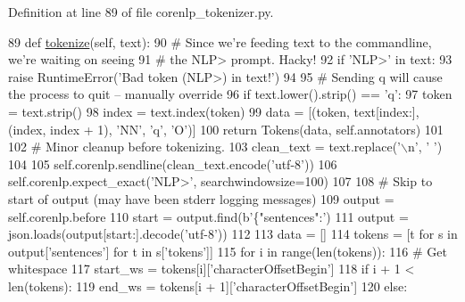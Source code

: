 Definition at line 89 of file corenlp\+\_\+tokenizer.\+py.


\begin{DoxyCode}
89     \textcolor{keyword}{def }\hyperlink{namespaceparlai_1_1agents_1_1tfidf__retriever_1_1build__tfidf_a1fdb457e98eb4e4c26047e229686a616}{tokenize}(self, text):
90         \textcolor{comment}{# Since we're feeding text to the commandline, we're waiting on seeing}
91         \textcolor{comment}{# the NLP> prompt. Hacky!}
92         \textcolor{keywordflow}{if} \textcolor{stringliteral}{'NLP>'} \textcolor{keywordflow}{in} text:
93             \textcolor{keywordflow}{raise} RuntimeError(\textcolor{stringliteral}{'Bad token (NLP>) in text!'})
94 
95         \textcolor{comment}{# Sending q will cause the process to quit -- manually override}
96         \textcolor{keywordflow}{if} text.lower().strip() == \textcolor{stringliteral}{'q'}:
97             token = text.strip()
98             index = text.index(token)
99             data = [(token, text[index:], (index, index + 1), \textcolor{stringliteral}{'NN'}, \textcolor{stringliteral}{'q'}, \textcolor{stringliteral}{'O'})]
100             \textcolor{keywordflow}{return} Tokens(data, self.annotators)
101 
102         \textcolor{comment}{# Minor cleanup before tokenizing.}
103         clean\_text = text.replace(\textcolor{stringliteral}{'\(\backslash\)n'}, \textcolor{stringliteral}{' '})
104 
105         self.corenlp.sendline(clean\_text.encode(\textcolor{stringliteral}{'utf-8'}))
106         self.corenlp.expect\_exact(\textcolor{stringliteral}{'NLP>'}, searchwindowsize=100)
107 
108         \textcolor{comment}{# Skip to start of output (may have been stderr logging messages)}
109         output = self.corenlp.before
110         start = output.find(b\textcolor{stringliteral}{'\{"sentences":'})
111         output = json.loads(output[start:].decode(\textcolor{stringliteral}{'utf-8'}))
112 
113         data = []
114         tokens = [t \textcolor{keywordflow}{for} s \textcolor{keywordflow}{in} output[\textcolor{stringliteral}{'sentences'}] \textcolor{keywordflow}{for} t \textcolor{keywordflow}{in} s[\textcolor{stringliteral}{'tokens'}]]
115         \textcolor{keywordflow}{for} i \textcolor{keywordflow}{in} range(len(tokens)):
116             \textcolor{comment}{# Get whitespace}
117             start\_ws = tokens[i][\textcolor{stringliteral}{'characterOffsetBegin'}]
118             \textcolor{keywordflow}{if} i + 1 < len(tokens):
119                 end\_ws = tokens[i + 1][\textcolor{stringliteral}{'characterOffsetBegin'}]
120             \textcolor{keywordflow}{else}:

\end{DoxyCode}
